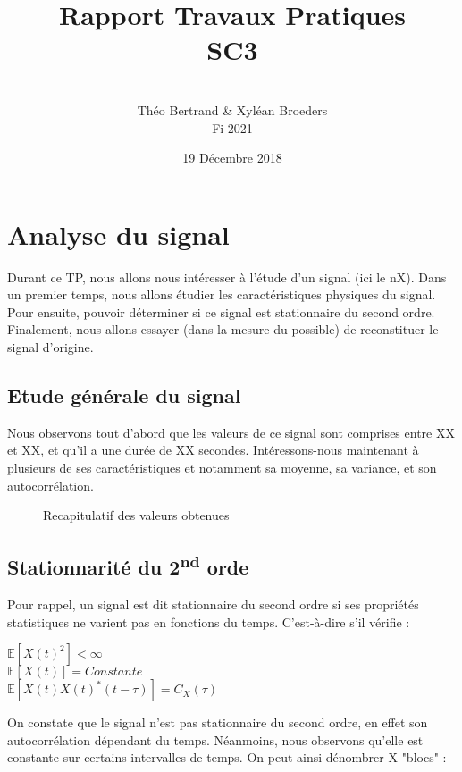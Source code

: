\documentclass[french, a4paper, 12pt, openany]{book}
\title{\Huge{Rapport Travaux Pratiques \\ SC3}}
\author{\\ Théo Bertrand \& Xyléan Broeders \\ Fi 2021}
\date{19 Décembre 2018}
\begin{document}
\maketitle

\chapter{Analyse du signal}
	Durant ce TP, nous allons nous intéresser à l'étude d'un signal (ici le nX). Dans un premier temps, nous allons étudier les caractéristiques physiques du signal.  Pour ensuite, pouvoir déterminer si ce signal est stationnaire du second ordre. Finalement, nous allons essayer (dans la mesure du possible) de reconstituer le signal d'origine.
\section{Etude générale du signal}
	Nous observons tout d'abord que les valeurs de ce signal sont comprises entre XX et XX, et qu’il a une durée de XX secondes. Intéressons-nous maintenant à plusieurs de ses caractéristiques et notamment sa moyenne, sa variance, et son autocorrélation.
  \begin{figure}[ht]
    \begin{center}
    \end{center}
    \caption{Recapitulatif des valeurs obtenues}
    \label{Recapitulatif des valeurs obtenues}
  \end{figure}

\section{Stationnarité du 2\textsuperscript{nd} orde}
	Pour rappel, un signal est dit stationnaire du second ordre si ses propriétés statistiques ne varient pas en fonctions du temps. C'est-à-dire s'il vérifie :
  \begin{center}
  	\begin{math}\mathbb{E}[X(t)^2]<\infty\end{math} \\
  	\begin{math}\mathbb{E}[X(t)]=Constante\end{math} \\
  	\begin{math}\mathbb{E}[X(t)X(t)^*(t-\tau)]=C_X(\tau)\end{math}
  \end{center}
	On constate que le signal n'est pas stationnaire du second ordre, en effet son autocorrélation dépendant du temps. Néanmoins, nous observons qu'elle est constante sur certains intervalles de temps. On peut ainsi dénombrer X "blocs" :
\end{document}
